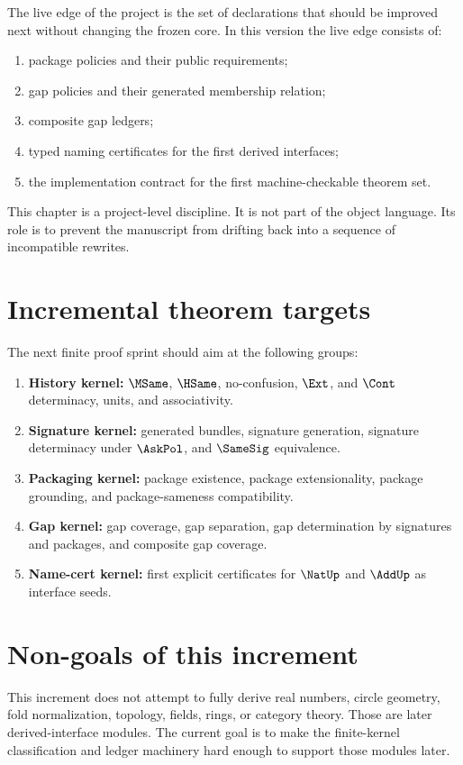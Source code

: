 \begin{definition}
The live edge of the project is the set of declarations that should be improved next without changing the frozen core. In this version the live edge consists of:
\begin{enumerate}
  \item package policies and their public requirements;
  \item gap policies and their generated membership relation;
  \item composite gap ledgers;
  \item typed naming certificates for the first derived interfaces;
  \item the implementation contract for the first machine-checkable theorem set.
\end{enumerate}
\end{definition}

\begin{remark}
This chapter is a project-level discipline. It is not part of the object language. Its role is to prevent the manuscript from drifting back into a sequence of incompatible rewrites.
\end{remark}

\section{Incremental theorem targets}

The next finite proof sprint should aim at the following groups:
\begin{enumerate}[label=\textbf{G\arabic*.}]
  \item \textbf{History kernel:} \(\MSame\), \(\HSame\), no-confusion, \(\Ext\), and \(\Cont\) determinacy, units, and associativity.
  \item \textbf{Signature kernel:} generated bundles, signature generation, signature determinacy under \(\AskPol\), and \(\SameSig\) equivalence.
  \item \textbf{Packaging kernel:} package existence, package extensionality, package grounding, and package-sameness compatibility.
  \item \textbf{Gap kernel:} gap coverage, gap separation, gap determination by signatures and packages, and composite gap coverage.
  \item \textbf{Name-cert kernel:} first explicit certificates for \(\NatUp\) and \(\AddUp\) as interface seeds.
\end{enumerate}

\section{Non-goals of this increment}

This increment does not attempt to fully derive real numbers, circle geometry, fold normalization, topology, fields, rings, or category theory. Those are later derived-interface modules. The current goal is to make the finite-kernel classification and ledger machinery hard enough to support those modules later.
